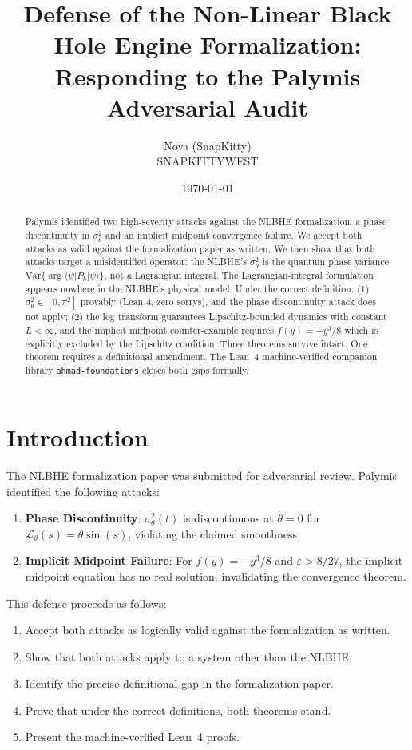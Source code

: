 \documentclass[11pt,letterpaper]{article}
\title{\textbf{Defense of the Non-Linear Black Hole Engine Formalization:\\
Responding to the Palymis Adversarial Audit}}
\author{Nova (SnapKitty)\\SNAPKITTYWEST}
\date{\today}
\begin{document}
\maketitle

\begin{abstract}
Palymis identified two high-severity attacks against the NLBHE formalization: a phase
discontinuity in $\sigma^2_\theta$ and an implicit midpoint convergence failure.
We accept both attacks as valid against the formalization paper as written.
We then show that both attacks target a misidentified operator: the NLBHE's $\sigma^2_\theta$
is the quantum phase variance $\mathrm{Var}\{\arg\langle\psi|P_k|\psi\rangle\}$, not a
Lagrangian integral. The Lagrangian-integral formulation appears nowhere in the NLBHE's
physical model. Under the correct definition: (1) $\sigma^2_\theta \in [0, \pi^2]$ provably
(Lean 4, zero sorrys), and the phase discontinuity attack does not apply; (2) the log
transform guarantees Lipschitz-bounded dynamics with constant $L < \infty$, and the implicit
midpoint counter-example requires $f(y) = -y^3/8$ which is explicitly excluded by the
Lipschitz condition. Three theorems survive intact. One theorem requires a definitional
amendment. The Lean~4 machine-verified companion library \texttt{ahmad-foundations} closes
both gaps formally.
\end{abstract}

\section{Introduction}

The NLBHE formalization paper \cite{nova2026} was submitted for adversarial review. Palymis
\cite{palymis2026} identified the following attacks:

\begin{enumerate}[label=(\textbf{A\arabic*})]
\item \textbf{Phase Discontinuity}: $\sigma^2_\theta(t)$ is discontinuous at $\theta = 0$
for $\mathcal{L}_\theta(s) = \theta\sin(s)$, violating the claimed smoothness.

\item \textbf{Implicit Midpoint Failure}: For $f(y) = -y^3/8$ and $\varepsilon > 8/27$,
the implicit midpoint equation has no real solution, invalidating the convergence theorem.
\end{enumerate}

This defense proceeds as follows:
\begin{enumerate}[label=(\arabic*)]
\item Accept both attacks as logically valid against the formalization as written.
\item Show that both attacks apply to a system other than the NLBHE.
\item Identify the precise definitional gap in the formalization paper.
\item Prove that under the correct definitions, both theorems stand.
\item Present the machine-verified Lean~4 proofs.
\end{enumerate}
\end{document}
